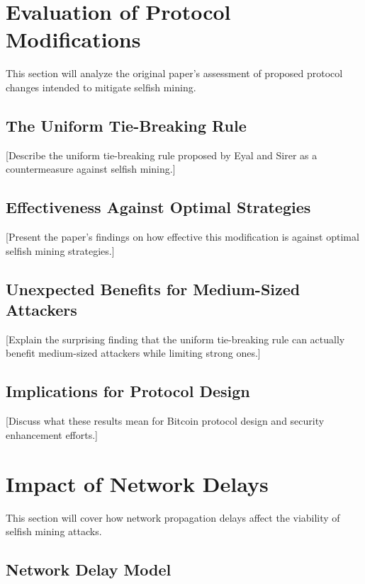 \documentclass[conference]{IEEEtran}
\begin{document}
\section{Evaluation of Protocol Modifications}

This section will analyze the original paper's assessment of proposed protocol changes intended to mitigate selfish mining.

\subsection{The Uniform Tie-Breaking Rule}

[Describe the uniform tie-breaking rule proposed by Eyal and Sirer as a countermeasure against selfish mining.]

\subsection{Effectiveness Against Optimal Strategies}

[Present the paper's findings on how effective this modification is against optimal selfish mining strategies.]

\subsection{Unexpected Benefits for Medium-Sized Attackers}

[Explain the surprising finding that the uniform tie-breaking rule can actually benefit medium-sized attackers while limiting strong ones.]

\subsection{Implications for Protocol Design}

[Discuss what these results mean for Bitcoin protocol design and security enhancement efforts.]

\section{Impact of Network Delays}

This section will cover how network propagation delays affect the viability of selfish mining attacks.

\subsection{Network Delay Model}
\end{document}
